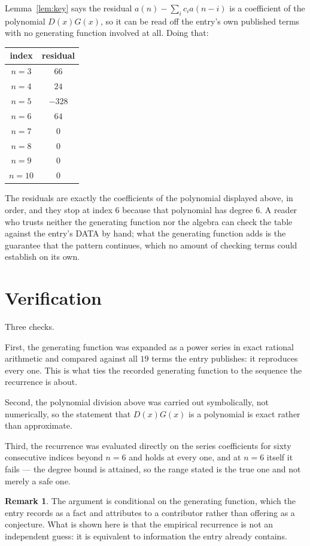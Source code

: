 \documentclass[11pt,a4paper]{article}
\theoremstyle{plain}
\theoremstyle{definition}
\newtheorem{remark}[theorem]{Remark}
\begin{document}
Lemma~\ref{lem:key} says the residual $a(n)-\sum_ic_ia(n-i)$ is a coefficient of the
polynomial $D(x)G(x)$, so it can be read off the entry's own published terms with no
generating function involved at all. Doing that:
\begin{center}
\begin{tabular}{cc}
index & residual \\ \hline
$n=3$ & $66$ \\
$n=4$ & $24$ \\
$n=5$ & $-328$ \\
$n=6$ & $64$ \\
$n=7$ & $0$ \\
$n=8$ & $0$ \\
$n=9$ & $0$ \\
$n=10$ & $0$
\end{tabular}
\end{center}
The residuals are exactly the coefficients of the polynomial displayed above, in order, and
they stop at index $6$ because that polynomial has degree $6$. A reader who trusts
neither the generating function nor the algebra can check the table against the entry's DATA
by hand; what the generating function adds is the guarantee that the pattern continues, which
no amount of checking terms could establish on its own.

\section{Verification}

Three checks.

First, the generating function was expanded as a power series in exact rational arithmetic and
compared against all $19$ terms the entry publishes: it reproduces every one. This is
what ties the recorded generating function to the sequence the recurrence is about.

Second, the polynomial division above was carried out symbolically, not numerically, so the
statement that $D(x)G(x)$ is a polynomial is exact rather than approximate.

Third, the recurrence was evaluated directly on the series coefficients for sixty consecutive
indices beyond $n=6$ and holds at every one, and at $n=6$ itself it fails --- the
degree bound is attained, so the range stated is the true one and not merely a safe one.

\begin{remark}
The argument is conditional on the generating function, which the entry records as a fact and
attributes to a contributor rather than offering as a conjecture. What is shown here is that
the empirical recurrence is not an independent guess: it is equivalent to information the
entry already contains.
\end{remark}
\end{document}
